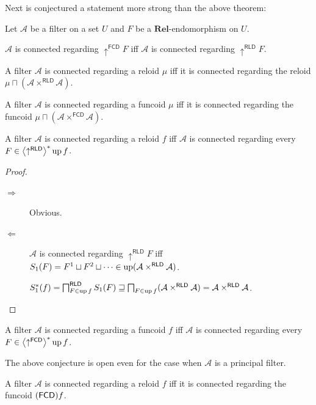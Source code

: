 Next is conjectured a statement more strong than the above theorem:
\begin{conjecture}
Let $\mathcal{A}$ be a filter on a set $U$ and $F$ be a $\mathbf{Rel}$-endomorphism
on $U$.

$\mathcal{A}$ is connected regarding $\uparrow^{\mathsf{FCD}}F$
iff $\mathcal{A}$ is connected regarding $\uparrow^{\mathsf{RLD}}F$.\end{conjecture}
\begin{obvious}
A filter $\mathcal{A}$ is connected regarding a reloid $\mu$ iff
it is connected regarding the reloid $\mu\sqcap(\mathcal{A}\times^{\mathsf{RLD}}\mathcal{A})$.
\end{obvious}

\begin{obvious}
A filter $\mathcal{A}$ is connected regarding a funcoid $\mu$ iff
it is connected regarding the funcoid $\mu\sqcap(\mathcal{A}\times^{\mathsf{FCD}}\mathcal{A})$.\end{obvious}
\begin{thm}
A filter $\mathcal{A}$ is connected regarding a reloid $f$ iff $\mathcal{A}$
is connected regarding every $F\in\left\langle \uparrow^{\mathsf{RLD}}\right\rangle ^{\ast}\operatorname{up} f$.\end{thm}
\begin{proof}
~
\begin{description}
\item [{$\Rightarrow$}] Obvious.
\item [{$\Leftarrow$}] $\mathcal{A}$ is connected regarding $\uparrow^{\mathsf{RLD}}F$
iff $S_1(F)=F^{1}\sqcup F^{2}\sqcup\dots\in\operatorname{up}(\mathcal{A}\times^{\mathsf{RLD}}\mathcal{A})$.


$S^{\ast}_1(f)=\bigsqcap_{F\in\operatorname{up} f}^{\mathsf{RLD}}S_1(F)\sqsupseteq\bigsqcap_{F\in\operatorname{up} f}(\mathcal{A}\times^{\mathsf{RLD}}\mathcal{A})=\mathcal{A}\times^{\mathsf{RLD}}\mathcal{A}$.

\end{description}
\end{proof}
\begin{conjecture}
A filter $\mathcal{A}$ is connected regarding a funcoid $f$ iff
$\mathcal{A}$ is connected regarding every $F\in\left\langle \uparrow^{\mathsf{FCD}}\right\rangle ^{\ast}\operatorname{up} f$.
\end{conjecture}
The above conjecture is open even for the case when $\mathcal{A}$
is a principal filter.
\begin{conjecture}
A filter $\mathcal{A}$ is connected regarding a reloid $f$ iff it
is connected regarding the funcoid $(\mathsf{FCD}) f$.
\end{conjecture}
